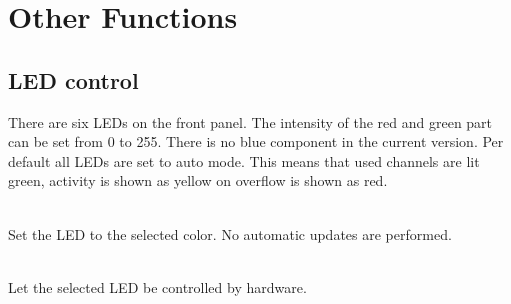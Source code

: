 		
	\section{Other Functions}
		\subsection{LED control}
		
			There are six LEDs on the front panel. The intensity of the red and green part can be set from 0 to 255. There is no blue component in the current version. Per default all LEDs are set to auto mode. This means that used channels are lit green, activity is shown as yellow on overflow is shown as red.\par

			    \\
			Set the LED to the selected color. No automatic updates are performed.\par
			
			 \\
			Let the selected LED be controlled by hardware. 